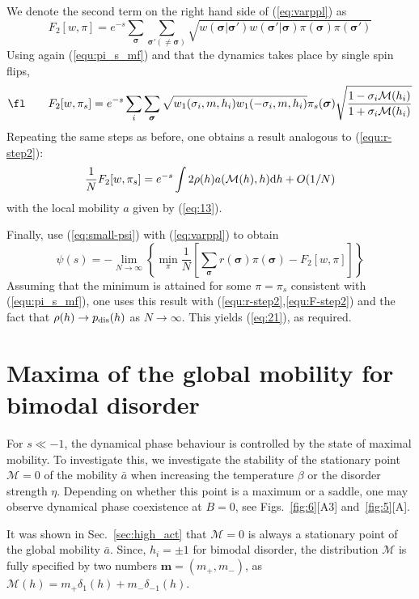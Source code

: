 \documentclass{iopart}
\newcommand{\dst}[0]{\ensuremath{\mathrm{d}}}
\newcommand{\mdis}[0]{\ensuremath{\mathcal{M}}}
\begin{document}
We denote the second term on the right hand side of (\ref{eq:varppl}) as
\begin{equation}
F_2[w,\pi] = e^{-s} \sum_{\bm{\sigma}} \sum_{\bm{\sigma}'(\neq\bm{\sigma})} \sqrt{w(\bm{\sigma}|\bm{\sigma}')w(\bm{\sigma}'|\bm{\sigma})
  \pi(\bm{\sigma})\pi(\bm{\sigma}')}
\end{equation}
Using again (\ref{equ:pi_s_mf}) and that the dynamics takes place by single spin flips,
\begin{equation}
\fl \qquad F_2[w,\pi_s]  = e^{-s} \sum_i \sum_{\bm{\sigma}} \sqrt{ w_1(\sigma_i,m,h_i) w_1(-\sigma_i,m,h_i) } \pi_s(\bm{\sigma}) \sqrt{\frac{1-\sigma_i\mm(h_i)}{1+\sigma_i\mm(h_i)} }
\end{equation}
Repeating the same steps as before, one obtains a result analogous to (\ref{equ:r-step2}):
\begin{equation}
\frac{1}{N} F_2[w,\pi_s]  = e^{-s} \int 2 \rho(h) a(\mm(h),h) \dst  h + O(1/N)
\label{equ:F-step2}
\end{equation}
with the local mobility $a$ given by (\ref{eq:13}).

Finally, use (\ref{eq:small-psi}) with (\ref{eq:varppl}) to obtain
\begin{equation}
\psi(s) = -
\lim_{N\to\infty}\left\{  \min_{\pi} \frac{1}{N} 
\left[ \sum_{\bm{\sigma}} r(\bm{\sigma}) \pi(\bm{\sigma}) - F_2[w,\pi] \right] \right\}
\end{equation}
Assuming that the minimum is attained for some $\pi=\pi_s$ consistent with (\ref{equ:pi_s_mf}), one uses this
result with (\ref{equ:r-step2},\ref{equ:F-step2}) and the fact that $\rho(h)\to p_{\rm dis}(h)$ as $N\to\infty$.  This yields (\ref{eq:21}), as required.

\section{Maxima of the global mobility for bimodal disorder}
\label{app:max_mob}

 For $s\ll -1$, the dynamical phase behaviour is controlled by the state of maximal mobility.  To investigate this, we investigate the stability of the stationary point $\mdis = 0$ of the mobility $\bar{a}$ when increasing the temperature $\beta$ or the disorder strength $\eta$. 
 Depending on whether this point is a maximum or a saddle, one may observe dynamical phase coexistence at $B=0$, see Figs.~\ref{fig:6}[A3] and~\ref{fig:5}[A].

It was shown in Sec.~\ref{sec:high_act} that $\mdis =0$ is always a stationary point of the global mobility $\bar{a}$. 
Since, $h_{i}=\pm 1$ for bimodal disorder, the distribution $\mdis$ is fully specified by two numbers $\bm{m}=(m_{+},m_{-})$, as $\mathcal{M}(h) = m_{+}\delta_{1}(h) + m_{-}\delta_{-1}(h)$.
\end{document}
